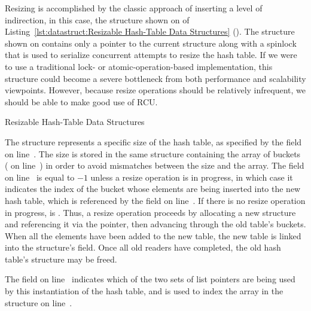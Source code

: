 \begin{fcvref}
Resizing is accomplished by the classic approach of inserting a level
of indirection, in this case, the  structure shown on
 of
Listing~\ref{lst:datastruct:Resizable Hash-Table Data Structures}
().
The  structure shown on
 contains only a
pointer to the current  structure along with a spinlock that
is used to serialize concurrent attempts to resize the hash table.
If we were to use a traditional lock- or atomic-operation-based
implementation, this  structure could become a severe bottleneck
from both performance and scalability viewpoints.
However, because resize operations should be relatively infrequent,
we should be able to make good use of RCU\@.

\begin{listing}

\caption{Resizable Hash-Table Data Structures}
\label{lst:datastruct:Resizable Hash-Table Data Structures}
\end{listing}

The  structure represents a specific size of the hash table,
as specified by the  field on line~.
The size is stored in the same structure containing the array of
buckets ( on
line~) in order to avoid mismatches between
the size and the array.
The  field on
line~ is equal to $-1$ unless a resize
operation
is in progress, in which case it indicates the index of the bucket whose
elements are being inserted into the new hash table, which is referenced
by the  field on line~.
If there is no resize operation in progress,  is .
Thus, a resize operation proceeds by allocating a new  structure
and referencing it via the  pointer, then advancing
 through the old table's buckets.
When all the elements have been added to the new table, the new
table is linked into the  structure's  field.
Once all old readers have completed, the old hash table's  structure
may be freed.

The  field on
line~ indicates which of the two sets of
list pointers are being used by this instantiation of the hash table,
and is used to index the  array in the 
structure on line~.


\end{fcvref}
